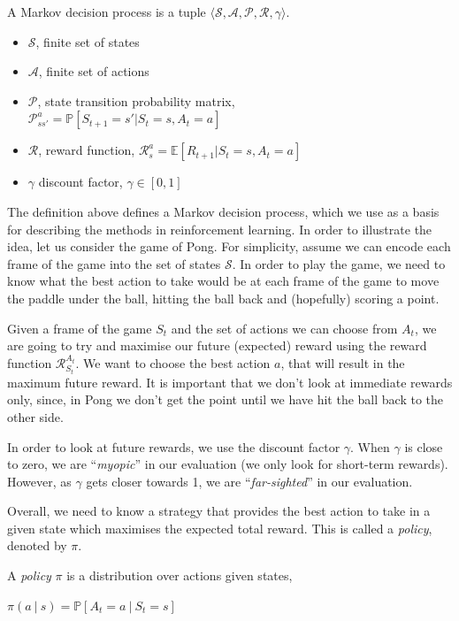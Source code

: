 \begin{defn}
	A Markov decision process is a tuple $\langle \mathcal{S}, \mathcal{A}, \mathcal{P}, \mathcal{R}, \gamma \rangle$.
	\begin{itemize}
		\item $\mathcal{S}$, finite set of states
		\item $\mathcal{A}$, finite set of actions
		\item $\mathcal{P}$, state transition probability matrix,~\\$\mathcal{P}_{ss'}^a = \mathbb{P}[S_{t+1}=s'|S_t=s, A_t=a]$
		\item $\mathcal{R}$, reward function, $\mathcal{R}_s^a = \mathbb{E}[R_{t+1}|S_t=s,A_t=a]$
		\item $\gamma$ discount factor, $\gamma\in[0,1]$
	\end{itemize}
\end{defn}

The definition above defines a Markov decision process, which we use as a basis for describing the methods in reinforcement learning. In order to illustrate the idea, let us consider the game of Pong. For simplicity, assume we can encode each frame of the game into the set of states $\mathcal{S}$. In order to play the game, we need to know what the best action to take would be at each frame of the game to move the paddle under the ball, hitting the ball back and (hopefully) scoring a point.

Given a frame of the game $S_t$ and the set of actions we can choose from $A_t$, we are going to try and maximise our future (expected) reward using the reward function $\mathcal{R}_{S_t}^{A_t}$. We want to choose the best action $a$, that will result in the maximum future reward. It is important that we don't look at immediate rewards only, since, in Pong we don't get the point until we have hit the ball back to the other side.

In order to look at future rewards, we use the discount factor $\gamma$. When $\gamma$ is close to zero, we are ``\textit{myopic}'' in our evaluation (we only look for short-term rewards). However, as $\gamma$ gets closer towards 1, we are ``\textit{far-sighted}'' in our evaluation.

Overall, we need to know a strategy that provides the best action to take in a given state which maximises the expected total reward. This is called a \textit{policy}, denoted by $\pi$.

\begin{defn}
	A \textit{policy} $\pi$ is a distribution over actions given states,
	\begin{center}
		$\pi(a~|~s)=\mathbb{P}[A_t=a~|~S_t=s]$
	\end{center}
\end{defn}

